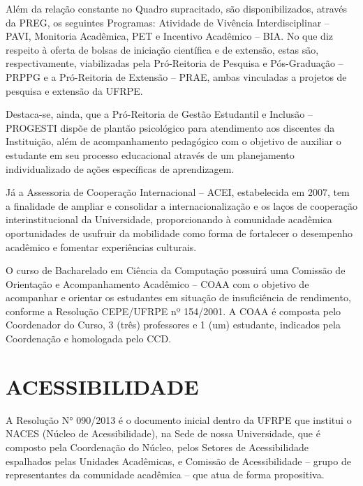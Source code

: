 \documentclass[
	12pt,				%
	openright,			%
  oneside,     %
	a4paper,			%
	chapter=TITLE,		%
	english,			%
	french,				%
	spanish,			%
	brazil				%
	]{abntex2}
\begin{document}
Além da relação constante no Quadro supracitado, são disponibilizados, através da PREG, os seguintes Programas: Atividade de Vivência Interdisciplinar – PAVI, Monitoria Acadêmica, PET e Incentivo Acadêmico – BIA. No que diz respeito à oferta de bolsas de iniciação científica e de extensão, estas são, respectivamente, viabilizadas pela Pró-Reitoria de Pesquisa e Pós-Graduação – PRPPG e a Pró-Reitoria de Extensão – PRAE, ambas vinculadas a projetos de pesquisa e extensão da UFRPE.

Destaca-se, ainda, que a Pró-Reitoria de Gestão Estudantil e Inclusão – PROGESTI dispõe de plantão psicológico para atendimento aos discentes da Instituição, além de acompanhamento pedagógico com o objetivo de auxiliar o estudante em seu processo educacional através de um planejamento individualizado de ações específicas de aprendizagem.

Já a Assessoria de Cooperação Internacional – ACEI, estabelecida em 2007, tem a finalidade de ampliar e consolidar a internacionalização e os laços de cooperação interinstitucional da Universidade, proporcionando à comunidade acadêmica oportunidades de usufruir da mobilidade como forma de fortalecer o desempenho acadêmico e fomentar experiências culturais.

O curso de Bacharelado em Ciência da Computação possuirá uma Comissão de Orientação e Acompanhamento Acadêmico – COAA com o objetivo de acompanhar e orientar os estudantes em situação de insuficiência de rendimento, conforme a Resolução CEPE/UFRPE nº 154/2001. A COAA é composta pelo Coordenador do Curso, 3 (três) professores e 1 (um) estudante, indicados pela Coordenação e homologada pelo CCD. 






%
%


\chapter{ACESSIBILIDADE}
\label{cap_acessibilidade}

A Resolução N° 090/2013 é o documento inicial dentro da UFRPE que institui o NACES (Núcleo de Acessibilidade), na Sede de nossa Universidade, que é composto pela Coordenação do Núcleo, pelos Setores de Acessibilidade espalhados pelas Unidades Acadêmicas, e Comissão de Acessibilidade – grupo de representantes da comunidade acadêmica – que atua de forma propositiva.
\end{document}

